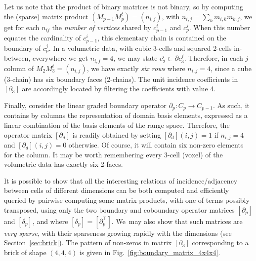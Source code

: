Let us note that the product of binary matrices is not binary, so by computing the (sparse) matrix product $(M_{p-1} M_{p}^t) = (n_{i,j})$, with $n_{i,j} = \sum_{k} m_{i,k}m_{k,j}$, we get for each $n_{ij}$ the \emph{number of vertices} shared by $c_{p-1}^i$ and $c_{p}^j$. When this number equates the cardinality of $c_{p-1}^i$, this elementary chain is contained on the boundary of $c_{p}^j$. In a volumetric data, with cubic 3-cells and squared 2-cells in-between, everywhere we get $n_{i,j}=4$, we may state $c_{2}^i\subset\partial c_{3}^j$. Therefore, in each $j$ column of $M_{2} M_{3}^t = (n_{i,j})$, we have exactly \emph{six rows} where  $n_{i,j} = 4$, since a cube (3-chain) has six boundary faces (2-chains). The unit incidence coefficients in $\left[\partial_3\right]$ are accordingly located by filtering the coefficients with value 4.

Finally, consider the linear graded boundary operator $\partial_p : C_p \to C_{p-1}$. As such, it contains by columns the representation of domain basis elements, expressed as a linear combination of the basis elements of the range space. Therefore, the operator matrix $[\partial_d]$ is readily obtained by setting $[\partial_d](i,j)=1$ if $n_{i,j}=4$ and $[\partial_d](i,j)=0$ otherwise.  Of course, it will contain six non-zero elements for the column.  It may be worth remembering every 3-cell (voxel) of the volumetric data has exactly six 2-faces. 

It is possible to show that all the interesting relations of incidence/adjacency between cells of different dimensions can be both computed and efficiently queried by pairwise computing some matrix products, with one of terms possibly transposed, using only the two boundary and coboundary operator matrices $[\partial_p]$ and $[\delta_p]$, and where $[\delta_p] = [\partial_p^\top]$. We~may also show that such matrices are \emph{very sparse}, with their sparseness growing rapidly with the dimensions (see Section~\ref{sec:brick}). The pattern of non-zeros in matrix $[\partial_3]$ corresponding to a brick of shape $(4,4,4)$ is given in Fig.~\ref{fig:boundary_matrix_4x4x4}.

